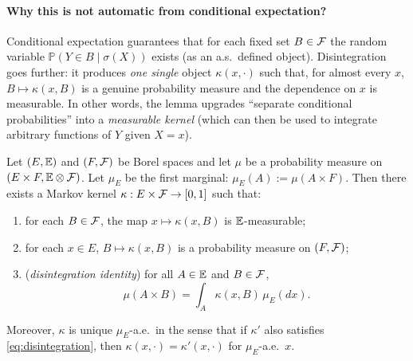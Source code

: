 \paragraph{Why this is not automatic from conditional expectation?}
Conditional expectation guarantees that for each fixed set $B\in\mathcal{F}$ the random variable
$\mathbb{P}(Y\in B\mid \sigma(X))$ exists (as an a.s.\ defined object).
Disintegration goes further: it produces \emph{one single} object $\kappa(x,\cdot)$ such that, for almost every $x$,
$B\mapsto \kappa(x,B)$ is a genuine probability measure and the dependence on $x$ is measurable.
In other words, the lemma upgrades ``separate conditional probabilities'' into a \emph{measurable kernel}
(which can then be used to integrate arbitrary functions of $Y$ given $X=x$).






\begin{theorem}
\label{thm:disintegration}
Let $(E,\mathbb{E})$ and $(F,\mathcal{F})$ be Borel spaces and let $\mu$ be a probability measure on $(E\times F,\mathbb{E}\otimes \mathcal{F})$.
Let $\mu_E$ be the first marginal: $\mu_E(A):=\mu(A\times F)$.
Then there exists a Markov kernel $\kappa:E\times \mathcal{F}\to[0,1]$ such that:
\begin{enumerate}[label=(\roman*)]
\item for each $B\in\mathcal{F}$, the map $x\mapsto \kappa(x,B)$ is $\mathbb{E}$-measurable;
\item for each $x\in E$, $B\mapsto \kappa(x,B)$ is a probability measure on $(F,\mathcal{F})$;
\item (\emph{disintegration identity}) for all $A\in\mathbb{E}$ and $B\in\mathcal{F}$,
\begin{equation}
\label{eq:disintegration}
\mu(A\times B)=\int_A \kappa(x,B)\,\mu_E(dx).
\end{equation}
\end{enumerate}
Moreover, $\kappa$ is unique $\mu_E$-a.e.\ in the sense that if $\kappa'$ also satisfies \eqref{eq:disintegration},
then $\kappa(x,\cdot)=\kappa'(x,\cdot)$ for $\mu_E$-a.e.\ $x$.
\end{theorem}

